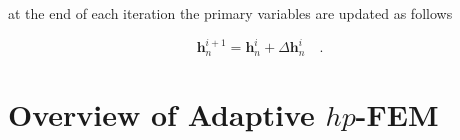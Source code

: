 \documentclass[final,3p,times,twocolumn]{elsarticle}
\newcommand{\bfx}{\mbox{\boldmath $x$}}
\newcommand{\bfS}{\mbox{\boldmath $S$}}
\begin{document}
at the end of each iteration the primary variables are updated as follows

$$\mathbf{h}_n^{i+1} = \mathbf{h}_n^i + \Delta \mathbf{h}^i_n \quad .$$



% 
% 
% 
% 
% 





\appendix

\section{Overview of Adaptive $hp$-FEM}
\label{sec:methods}
\end{document}
